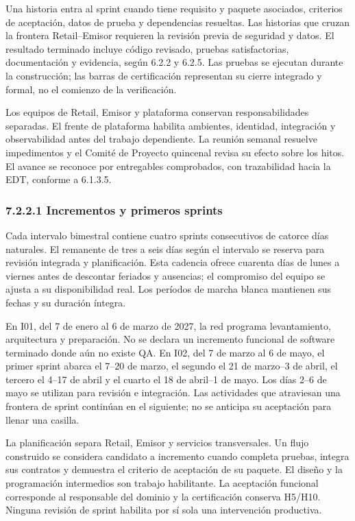 \documentclass[11pt]{article}
\begin{document}
Una historia entra al sprint cuando tiene requisito y paquete asociados, criterios de aceptación, datos de prueba y dependencias resueltas. Las historias que cruzan la frontera Retail–Emisor requieren la revisión previa de seguridad y datos. El resultado terminado incluye código revisado, pruebas satisfactorias, documentación y evidencia, según 6.2.2 y 6.2.5. Las pruebas se ejecutan durante la construcción; las barras de certificación representan su cierre integrado y formal, no el comienzo de la verificación.

Los equipos de Retail, Emisor y plataforma conservan responsabilidades separadas. El frente de plataforma habilita ambientes, identidad, integración y observabilidad antes del trabajo dependiente. La reunión semanal resuelve impedimentos y el Comité de Proyecto quincenal revisa su efecto sobre los hitos. El avance se reconoce por entregables comprobados, con trazabilidad hacia la EDT, conforme a 6.1.3.5.

\subsubsection{7.2.2.1 Incrementos y primeros sprints}

Cada intervalo bimestral contiene cuatro sprints consecutivos de catorce días naturales. El remanente de tres a seis días según el intervalo se reserva para revisión integrada y planificación. Esta cadencia ofrece cuarenta días de lunes a viernes antes de descontar feriados y ausencias; el compromiso del equipo se ajusta a su disponibilidad real. Los períodos de marcha blanca mantienen sus fechas y su duración íntegra.

En I01, del 7 de enero al 6 de marzo de 2027, la red programa levantamiento, arquitectura y preparación. No se declara un incremento funcional de software terminado donde aún no existe QA. En I02, del 7 de marzo al 6 de mayo, el primer sprint abarca el 7--20 de marzo, el segundo el 21 de marzo--3 de abril, el tercero el 4--17 de abril y el cuarto el 18 de abril--1 de mayo. Los días 2--6 de mayo se utilizan para revisión e integración. Las actividades que atraviesan una frontera de sprint continúan en el siguiente; no se anticipa su aceptación para llenar una casilla.

La planificación separa Retail, Emisor y servicios transversales. Un flujo construido se considera candidato a incremento cuando completa pruebas, integra sus contratos y demuestra el criterio de aceptación de su paquete. El diseño y la programación intermedios son trabajo habilitante. La aceptación funcional corresponde al responsable del dominio y la certificación conserva H5/H10. Ninguna revisión de sprint habilita por sí sola una intervención productiva.
\end{document}
